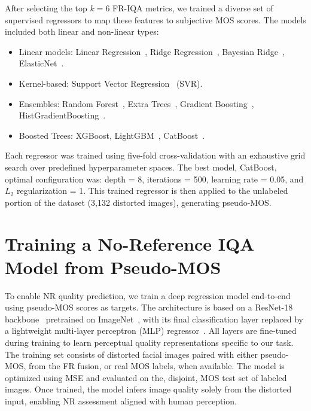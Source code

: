 After selecting the top $k = 6$ FR-IQA metrics, we trained a diverse set of supervised regressors to map these features to subjective MOS scores. The models included both linear and non-linear types:

\begin{itemize}
    \item Linear models: Linear Regression~\cite{linearregression}, Ridge Regression~\cite{ridgeregression}, Bayesian Ridge~\cite{bayesianridge}, ElasticNet~\cite{elasticnet}.
    \item Kernel-based: Support Vector Regression~\cite{svr} (SVR).
    \item Ensembles: Random Forest~\cite{randomforest}, Extra Trees~\cite{ensembles}, Gradient Boosting~\cite{gradboosting}, HistGradientBoosting~\cite{histboost}.
    \item Boosted Trees: XGBoost\cite{xgboost}, LightGBM~\cite{lightgbm}, CatBoost~\cite{catboost}.
\end{itemize}

Each regressor was trained using five-fold cross-validation with an exhaustive grid search over predefined hyperparameter spaces. The best model, CatBoost, optimal configuration was: depth = 8, iterations = 500, learning rate = 0.05, and $L_2$ regularization = 1. This trained regressor is then applied to the unlabeled portion of the dataset (3,132 distorted images), generating pseudo-MOS.\@

\section{Training a No-Reference IQA Model from Pseudo-MOS}

To enable NR quality prediction, we train a deep regression model end-to-end using pseudo-MOS scores as targets. The architecture is based on a ResNet-18 backbone~\cite{resnet} pretrained on ImageNet~\cite{imagenet}, with its final classification layer replaced by a lightweight multi-layer perceptron (MLP) regressor~\cite{bayesianridge}. All layers are fine-tuned during training to learn perceptual quality representations specific to our task. The training set consists of distorted facial images paired with either pseudo-MOS, from the FR fusion, or real MOS labels, when available. The model is optimized using MSE and evaluated on the, disjoint, MOS test set of labeled images. Once trained, the model infers image quality solely from the distorted input, enabling NR assessment aligned with human perception.

